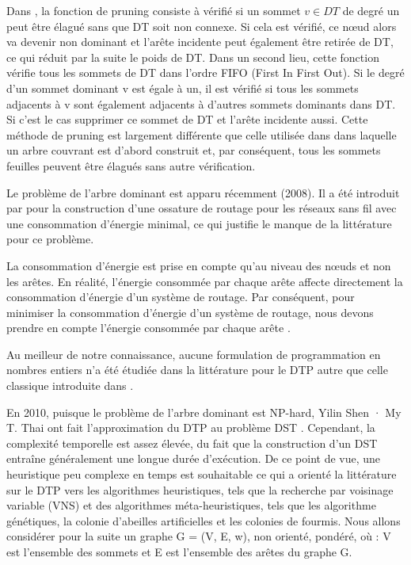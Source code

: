 Dans \cite{sundar2013new}, la fonction de pruning consiste à vérifié si un sommet $v \in DT$  de degré un peut être élagué  sans  que DT soit non connexe. Si cela est vérifié, ce nœud alors va devenir non dominant et l’arête incidente peut également être retirée de DT, ce qui réduit par la suite le poids de DT. Dans un second lieu, cette fonction vérifie  tous les sommets de DT dans l’ordre FIFO (First In First Out). Si le degré d’un sommet dominant v est égale à un, il est vérifié si tous les sommets adjacents à v sont également adjacents à d’autres sommets dominants dans DT. Si c’est le cas supprimer ce sommet de DT et l’arête incidente aussi. Cette méthode de pruning est largement différente que celle utilisée dans \cite{shin2010approximation} dans laquelle un arbre couvrant est d'abord construit et, par conséquent, tous les sommets feuilles peuvent être élagués sans autre vérification. 


Le problème de l’arbre dominant est apparu récemment (2008). Il a été introduit par \cite{zhang2008new} pour la construction d’une ossature de routage pour les réseaux sans fil avec une consommation d’énergie minimal, ce qui justifie le manque de la littérature pour ce problème. 

La consommation d’énergie est prise en compte qu’au niveau des nœuds et non les arêtes. En réalité, l'énergie consommée par chaque arête affecte directement la consommation d'énergie d'un système de routage. Par conséquent, pour minimiser la consommation d'énergie d'un système de routage, nous devons prendre en compte l'énergie consommée par chaque arête \cite{sundar2013new}.

Au meilleur de notre connaissance, aucune formulation de programmation en nombres entiers n'a été étudiée dans la littérature pour le DTP autre que celle classique introduite dans \cite{shin2010approximation}. 

En  2010, puisque le problème de l’arbre dominant est NP-hard, Yilin Shen · My T. Thai ont fait l'approximation du DTP au problème DST \cite{shin2010approximation}. Cependant, la complexité temporelle est assez élevée, du fait que la construction d'un DST entraîne généralement une longue durée d'exécution. De ce point de vue, une heuristique peu complexe en temps est souhaitable ce qui a orienté la littérature sur le DTP vers les algorithmes heuristiques, tels que la recherche par voisinage variable (VNS) et des algorithmes méta-heuristiques, tels que les algorithme génétiques, la colonie d'abeilles artificielles et les colonies de fourmis. 
Nous allons considérer pour la suite un graphe G = (V, E, w), non orienté, pondéré, où : V est l’ensemble des sommets et E est l’ensemble des arêtes du graphe G.

